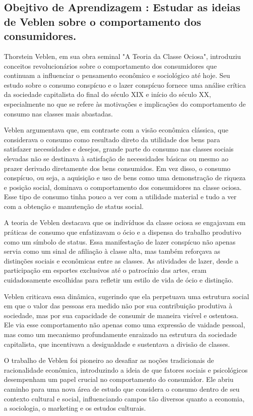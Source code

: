 \documentclass[12pt]{article}
\begin{document}
\subsection{\textbf{Obejtivo de Aprendizagem : Estudar as ideias de Veblen sobre o comportamento dos consumidores.}}
Thorstein Veblen, em sua obra seminal "A Teoria da Classe Ociosa", introduziu conceitos revolucionários sobre o comportamento dos consumidores que continuam a influenciar o pensamento econômico e sociológico até hoje. Seu estudo sobre o consumo conspícuo e o lazer conspícuo fornece uma análise crítica da sociedade capitalista do final do século XIX e início do século XX, especialmente no que se refere às motivações e implicações do comportamento de consumo nas classes mais abastadas.

Veblen argumentava que, em contraste com a visão econômica clássica, que considerava o consumo como resultado direto da utilidade dos bens para satisfazer necessidades e desejos, grande parte do consumo nas classes sociais elevadas não se destinava à satisfação de necessidades básicas ou mesmo ao prazer derivado diretamente dos bens consumidos. Em vez disso, o consumo conspícuo, ou seja, a aquisição e uso de bens como uma demonstração de riqueza e posição social, dominava o comportamento dos consumidores na classe ociosa. Esse tipo de consumo tinha pouco a ver com a utilidade material e tudo a ver com a obtenção e manutenção de status social.

A teoria de Veblen destacava que os indivíduos da classe ociosa se engajavam em práticas de consumo que enfatizavam o ócio e a dispensa do trabalho produtivo como um símbolo de status. Essa manifestação de lazer conspícuo não apenas servia como um sinal de afiliação à classe alta, mas também reforçava as distinções sociais e econômicas entre as classes. As atividades de lazer, desde a participação em esportes exclusivos até o patrocínio das artes, eram cuidadosamente escolhidas para refletir um estilo de vida de ócio e distinção.

Veblen criticava essa dinâmica, sugerindo que ela perpetuava uma estrutura social em que o valor das pessoas era medido não por sua contribuição produtiva à sociedade, mas por sua capacidade de consumir de maneira visível e ostentosa. Ele via esse comportamento não apenas como uma expressão de vaidade pessoal, mas como um mecanismo profundamente enraizado na estrutura da sociedade capitalista, que incentivava a desigualdade e sustentava a divisão de classes.

O trabalho de Veblen foi pioneiro ao desafiar as noções tradicionais de racionalidade econômica, introduzindo a ideia de que fatores sociais e psicológicos desempenham um papel crucial no comportamento do consumidor. Ele abriu caminho para uma nova área de estudo que considera o consumo dentro de seu contexto cultural e social, influenciando campos tão diversos quanto a economia, a sociologia, o marketing e os estudos culturais.
\end{document}
